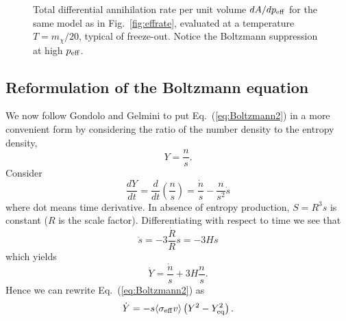 \documentclass[a4paper,10pt,oneside]{book}
\begin{document}
\begin{figure}
  \centerline{}
  \caption{Total differential annihilation rate per unit volume 
    $dA/dp_{\rm eff}$ for the same model as in
    Fig.~\protect\ref{fig:effrate}, evaluated at a temperature
    $T=m_\chi/20$, typical of freeze-out. Notice the Boltzmann
    suppression at high $p_{\rm eff}$.}
  \label{fig:k1effrate}
\end{figure}



\subsection{Reformulation of the Boltzmann equation}

We now follow Gondolo and Gelmini \cite{Gondolo:1990dk} to 
put Eq.~(\ref{eq:Boltzmann2}) in a more convenient form by
considering the ratio of the number density to the entropy density,
\begin{equation} \label{eq:ydef}
  Y = \frac{n}{s}.
\end{equation}
Consider
\begin{equation}
  \frac{dY}{dt} = \frac{d}{dt} \left( \frac{n}{s} \right) = 
  \frac{\dot{n}}{s}-\frac{n}{s^2}\dot{s}
\end{equation}
where dot means time derivative. In absence
of entropy production, $S=R^3s$ is constant ($R$ is the scale factor).
Differentiating with respect to time we see 
that
\begin{equation}
  \dot{s} = -3\frac{\dot{R}}{R} s = -3Hs
\label{eq:entropycons}
\end{equation}
which yields
\begin{equation}
  \dot{Y} = \frac{\dot{n}}{s} + 3H \frac{n}{s}.
\end{equation}
Hence we can rewrite Eq.~(\ref{eq:Boltzmann2}) as
\begin{equation} \label{eq:Boltzmann3}
  \dot{Y} = -s  \langle \sigma_{\rm{eff}} v \rangle 
  \left( Y^2 - Y_{\rm{eq}}^2 \right).
\end{equation}
\end{document}
